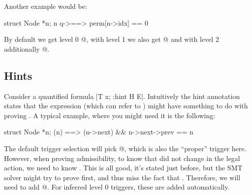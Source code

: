 Another example would be:
\begin{VCC}
\forall struct Node *n; n \in q->\owns ==> perm[n->idx] == 0
\end{VCC}
By default we get level 0 @, with level 1 we also get
@ and with level 2 additionally @.

\subsection{Hints}
\label{sect:trigger-hints}

Consider a quantified formula \vcc|\forall T x; {:hint H} E|.
Intuitively the hint annotation states that the expression  (which can
refer to ) might have something to do with proving .
A typical example, where you might need it is the following:
\begin{VCC}
\forall struct Node *n; \mine(n) ==> \mine(n->next) && n->next->prev == n
\end{VCC}
The default trigger selection will pick @, which is also
the ``proper'' trigger here. 
However, when proving admissibility, to know that  did not
change in the legal action, we need to know .
This is all good, it's stated just before, but the SMT solver
might try to prove  first,
and thus miss the fact that .
Therefore, we will need to add @.
For inferred level 0 triggers, these are added automatically.


%
%
%



